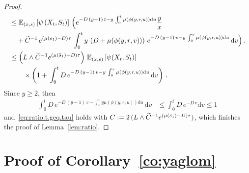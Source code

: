 \documentclass[AHL,Unicode,longabstracts,published]{cedram}
\newcommand{\EE}{\mathbb{E}}
\newcommand{\dif}{\mathrm{d}}
\newcommand{\barmu}{\mu(\bar s_1)}
\newcommand{\1}{\mathbf{1}}
\let\oldtilde\tilde
\renewcommand*{\tilde}[1]{\mathchoice{\widetilde{#1}}{\widetilde{#1}}{\oldtilde{#1}}{\oldtilde{#1}}}
\begin{document}
\begin{proof}
\begin{multline*}
\begin{aligned}
&\leq \EE_{(x,s)} \left[\psi \left(X_{t}, S_{t}\right)\right]\,\Big(e^{-D\,(y-1)\, t - y\,\int_0^t \mu (\phi(y,r,u)) \dif u} \frac{y}{x}\\
&\quad + \tilde C^{-1}\,e^{(\barmu-D) \tau} \,\int_0^t y\,\left(D+\mu (\phi(y,r,v))\right)\, e^{-D\,(y-1)\, v -y \,\int_0^v \mu \left(\phi(y,r,u)\right) \dif u}\, \dif v\Big)\,.
\\
&\leq \left(L\wedge \tilde C^{-1}e^{(\barmu-D) \tau}\right)\,\EE_{(x,s)} \left[\psi (X_{t}, S_{t})\right]
\\ & \qquad \times \left(1+ \,\int_0^t D\, e^{-D\,(y-1)\, v -y \,\int_0^v \mu (\phi(y,r,u)) \dif u}\, \dif v\right)\,.
\end{aligned}
\end{multline*}
Since $y\geq 2$, then
\begin{align*}
\int_0^t D\, e^{-D\,(y-1)\, v - \int_0^v y \mu (\phi(y,r,u)) \dif u}\, \dif v & \leq \int_0^t D\, e^{-D\, v} \dif v \leq 1
\end{align*}
and~\eqref{eq:ratio.t.geq.tau} holds with $C:=2\,(L\wedge \tilde C^{-1}e^{(\barmu-D) \tau})$, which finishes the proof of Lemma~\ref{lem:ratio}.
\end{proof}



\section{Proof of Corollary~\ref{co:yaglom}}\label{sec:proof.corollary}
\end{document}
